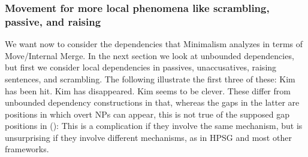 \documentclass[output=paper
                ,modfonts
                ,nonflat
	        ,collection
	        ,collectionchapter
	        ,collectiontoclongg
 	        ,biblatex
                ,babelshorthands
                ,newtxmath
                ,draftmode
                ,colorlinks, citecolor=brown
]{./langsci/langscibook}
\begin{document}
\subsubsection{Movement for more local phenomena like scrambling, passive, and raising}
\label{sec-passive-raising-minimalism}

We want now to consider the dependencies that Minimalism analyzes in terms of Move/Internal
Merge. In the next section we look at unbounded dependencies, but first we consider local
dependencies in passives, unaccusatives, raising sentences, and scrambling. The following illustrate
the first three of these:
\eal\label{ex:min-kim-has-seems}
\ex Kim has been hit.
\ex Kim has disappeared.
\ex Kim seems to be clever.
\zl
These differ from unbounded dependency constructions in that, whereas the gaps in the latter are
positions in which overt NPs can appear, this is not true of the supposed gap positions in ():
\eal
{}
\zl 
This is a complication if they involve the same mechanism, but is unsurprising if they involve
different mechanisms, as in HPSG and most other frameworks.

\end{document}
